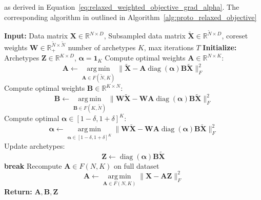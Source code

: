 \documentclass{article}
\begin{document}
as derived in Equation~\ref{eq:relaxed_weighted_objective_grad_alpha}. The corresponding algorithm in outlined in Algorithm~\ref{alg:proto_relaxed_objective}

\begin{algorithm}[H]
    \caption{Prototypical Algorithm for using Coresets and Relaxation of Archetypal Constraints}
    \label{alg:proto_relaxed_weighted_objective}
    \begin{algorithmic}[1]
    \State \textbf{Input:} Data matrix $\mathbf{X} \in \mathbb{R}^{N \times D}$, Subsampled data matrix $\tilde{\mathbf{X}} \in \mathbb{R}^{\tilde{N} \times D}$, coreset weights $\mathbf{W} \in \mathbb{R}_+^{\tilde{N} \times \tilde{N}}$ number of archetypes $K$, max iterations $T$
    \State \textbf{Initialize:} Archetypes $\mathbf{Z} \in \mathbb{R}^{K \times D}$, $\boldsymbol{\alpha} = \mathbf{1}_K$
        \State Compute optimal weights $\mathbf{A} \in \mathbb{R}^{N \times K}$:
        \begin{equation}
        \mathbf{A} \gets \operatorname*{arg\,min}_{\mathbf{A} \in F(\tilde{N}, K)} \| \tilde{\mathbf{X}} - {\mathbf{A}} \operatorname{diag}(\boldsymbol{\alpha}) \mathbf{B} \tilde{\mathbf{X}} \|_F^2
        \end{equation}
        \State Compute optimal weights $\mathbf{B} \in \mathbb{R}^{K \times N}$:
        \begin{equation}
        \mathbf{B} \gets \operatorname*{arg\,min}_{\mathbf{B} \in F(K, \tilde{N})} \| \mathbf{W} \tilde{\mathbf{X}} - \mathbf{W} {\mathbf{A}} \operatorname{diag}(\boldsymbol{\alpha}) \mathbf{B} \tilde{\mathbf{X}} \|_F^2
        \end{equation}
        \State Compute optimal $\boldsymbol{\alpha} \in [1-\delta, 1+\delta]^K$:
        \begin{equation}
        \boldsymbol{\alpha} \gets \operatorname*{arg\,min}_{\boldsymbol{\alpha} \in [1-\delta, 1+\delta]^K} \| \mathbf{W} \tilde{\mathbf{X}} - \mathbf{W} {\mathbf{A}} \operatorname{diag}(\boldsymbol{\alpha}) \mathbf{B} \tilde{\mathbf{X}} \|_F^2
        \end{equation}
        \State Update archetypes:
        \begin{equation}
        \mathbf{Z} \gets \operatorname{diag}(\boldsymbol{\alpha}) \mathbf{B} \tilde{\mathbf{X}}
        \end{equation}
            \State \textbf{break}
        \EndIf
    \EndFor
    \State Recompute $\mathbf{A} \in F(N, K)$ on full dataset
    \begin{equation}
    \mathbf{A} \gets \operatorname*{arg\,min}_{\mathbf{A} \in F(N, K)} \| \mathbf{X} - {\mathbf{A}} \mathbf{Z} \|_F^2
    \end{equation}
    \State \textbf{Return:} $\mathbf{A}, \mathbf{B}, \mathbf{Z}$
    \end{algorithmic}
\end{algorithm}
\end{document}

